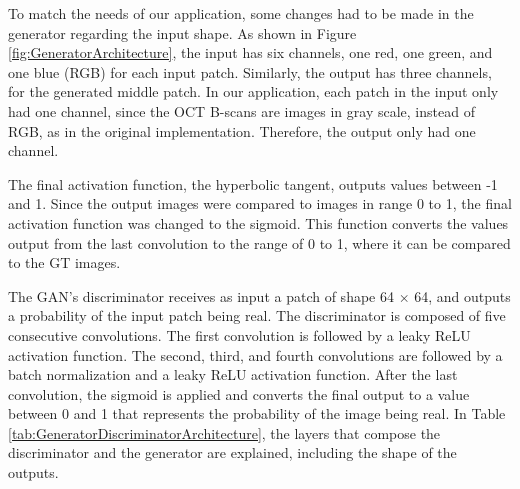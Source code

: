 To match the needs of our application, some changes had to be made in the generator regarding the input shape. As shown in Figure \ref{fig:GeneratorArchitecture}, the input has six channels, one red, one green, and one blue (RGB) for each input patch. Similarly, the output has three channels, for the generated middle patch. In our application, each patch in the input only had one channel, since the OCT B-scans are images in gray scale, instead of RGB, as in the original implementation. Therefore, the output only had one channel. 
\par
The final activation function, the hyperbolic tangent, outputs values between -1 and 1. Since the output images were compared to images in range 0 to 1, the final activation function was changed to the sigmoid. This function converts the values output from the last convolution to the range of 0 to 1, where it can be compared to the GT images.
\par
The GAN's discriminator receives as input a patch of shape 64 $\times$ 64, and outputs a probability of the input patch being real. The discriminator is composed of five consecutive convolutions. The first convolution is followed by a leaky ReLU activation function. The second, third, and fourth convolutions are followed by a batch normalization and a leaky ReLU activation function. After the last convolution, the sigmoid is applied and converts the final output to a value between 0 and 1 that represents the probability of the image being real. In Table \ref{tab:GeneratorDiscriminatorArchitecture}, the layers that compose the discriminator and the generator are explained, including the shape of the outputs.

